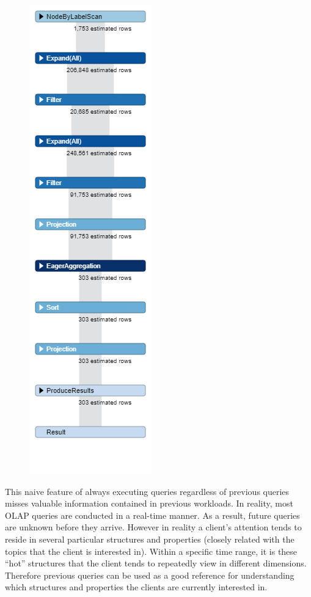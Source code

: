 \begin {figure}[H]
\includegraphics[scale=0.4]{pic/5.png}

\end{figure}

This naive feature of always executing queries regardless of previous queries misses valuable information contained in previous workloads. In reality, most OLAP queries are conducted in a real-time manner. As a result, future queries are unknown before they arrive. However in reality a client’s attention tends to reside in several particular structures and properties (closely related with the topics that the client is interested in). Within a specific time range, it is these “hot” structures that the client tends to repeatedly view in different dimensions. Therefore previous queries can be used as a good reference for understanding which structures and properties the clients are currently interested in. 
 
